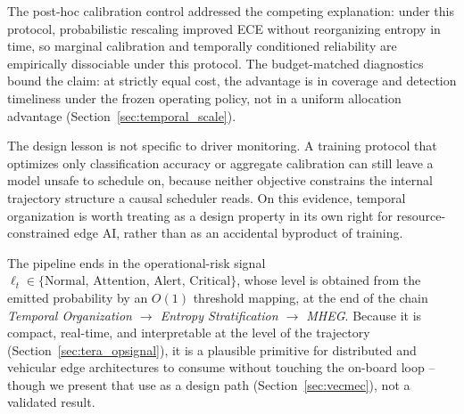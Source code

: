 \documentclass[a4paper,fleqn]{cas-dc}
\begin{document}
The post-hoc calibration control addressed the competing
explanation: under this protocol, probabilistic rescaling improved ECE without
reorganizing entropy in time, so marginal calibration and temporally
conditioned reliability are empirically dissociable under this protocol.
{\color{\revcolor}The budget-matched diagnostics bound the claim: at strictly
equal cost, the advantage is in coverage and detection timeliness under the
frozen operating policy, not in a uniform allocation advantage
(Section~\ref{sec:temporal_scale}).}

The design lesson is not specific to driver monitoring. A training protocol that
optimizes only classification accuracy or aggregate calibration can still leave a
model unsafe to schedule on, because neither objective constrains the internal
trajectory structure a causal scheduler reads. On this evidence, temporal
organization is worth treating as a design property in its own right for
resource-constrained edge AI, rather than as an accidental byproduct of training.

The pipeline ends in the operational-risk signal
$\ell_t \in \{\text{Normal},\, \text{Attention},\, \text{Alert},\, \text{Critical}\}$,
{\color{\revcolor}whose level is obtained from the emitted probability by an
$O(1)$ threshold mapping, at the end of the chain} \emph{Temporal Organization
$\rightarrow$ Entropy Stratification $\rightarrow$ MHEG}. Because it is compact, real-time, and
interpretable at the level of the trajectory (Section~\ref{sec:tera_opsignal}), it is
a plausible primitive for distributed and vehicular edge architectures to consume
without touching the on-board loop -- though we present that use as a design path
(Section~\ref{sec:vecmec}), not a validated result.
\end{document}
